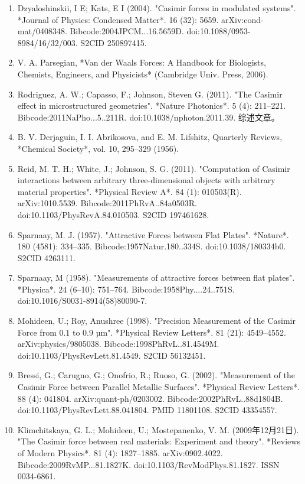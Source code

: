 \begin{enumerate}
\item Dzyaloshinskii, I E; Kats, E I (2004). "Casimir forces in modulated systems". *Journal of Physics: Condensed Matter*. 16 (32): 5659. arXiv:cond-mat/0408348. Bibcode:2004JPCM...16.5659D. doi:10.1088/0953-8984/16/32/003. S2CID 250897415.
\item V. A. Parsegian, *Van der Waals Forces: A Handbook for Biologists, Chemists, Engineers, and Physicists* (Cambridge Univ. Press, 2006).
\item Rodriguez, A. W.; Capasso, F.; Johnson, Steven G. (2011). "The Casimir effect in microstructured geometries". *Nature Photonics*. 5 (4): 211–221. Bibcode:2011NaPho...5..211R. doi:10.1038/nphoton.2011.39. 综述文章。
\item B. V. Derjaguin, I. I. Abrikosova, and E. M. Lifshitz, Quarterly Reviews, *Chemical Society*, vol. 10, 295–329 (1956).
\item Reid, M. T. H.; White, J.; Johnson, S. G. (2011). "Computation of Casimir interactions between arbitrary three-dimensional objects with arbitrary material properties". *Physical Review A*. 84 (1): 010503(R). arXiv:1010.5539. Bibcode:2011PhRvA..84a0503R. doi:10.1103/PhysRevA.84.010503. S2CID 197461628.
\item Sparnaay, M. J. (1957). "Attractive Forces between Flat Plates". *Nature*. 180 (4581): 334–335. Bibcode:1957Natur.180..334S. doi:10.1038/180334b0. S2CID 4263111.
\item Sparnaay, M (1958). "Measurements of attractive forces between flat plates". *Physica*. 24 (6–10): 751–764. Bibcode:1958Phy....24..751S. doi:10.1016/S0031-8914(58)80090-7.
\item Mohideen, U.; Roy, Anushree (1998). "Precision Measurement of the Casimir Force from 0.1 to 0.9 µm". *Physical Review Letters*. 81 (21): 4549–4552. arXiv:physics/9805038. Bibcode:1998PhRvL..81.4549M. doi:10.1103/PhysRevLett.81.4549. S2CID 56132451.
\item Bressi, G.; Carugno, G.; Onofrio, R.; Ruoso, G. (2002). "Measurement of the Casimir Force between Parallel Metallic Surfaces". *Physical Review Letters*. 88 (4): 041804. arXiv:quant-ph/0203002. Bibcode:2002PhRvL..88d1804B. doi:10.1103/PhysRevLett.88.041804. PMID 11801108. S2CID 43354557.
\item Klimchitskaya, G. L.; Mohideen, U.; Mostepanenko, V. M. (2009年12月21日). "The Casimir force between real materials: Experiment and theory". *Reviews of Modern Physics*. 81 (4): 1827–1885. arXiv:0902.4022. Bibcode:2009RvMP...81.1827K. doi:10.1103/RevModPhys.81.1827. ISSN 0034-6861.

\end{enumerate}
